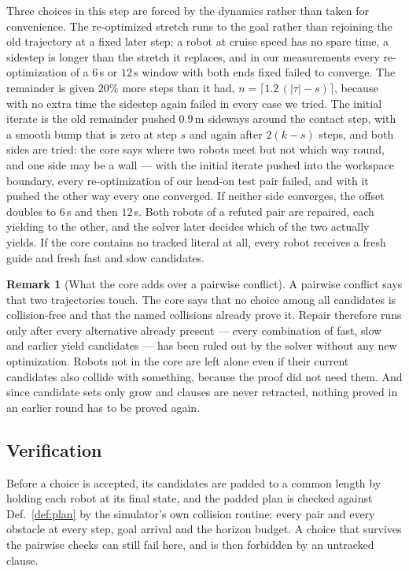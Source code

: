 \documentclass[conference]{IEEEtran}
\theoremstyle{plain}
\theoremstyle{definition}
\newtheorem{remark}{Remark}
\begin{document}
Three choices in this step are forced by the dynamics rather than taken for convenience. The
re-optimized stretch runs to the goal rather than rejoining the old trajectory at a fixed later
step: a robot at cruise speed has no spare time, a sidestep is longer than the stretch it
replaces, and in our measurements every re-optimization of a $6$\,s or $12$\,s window with both
ends fixed failed to converge. The remainder is given $20\%$ more steps than it had,
$n = \lceil 1.2\,(|\tau| - s)\rceil$, because with no extra time the sidestep again failed in
every case we tried. The initial iterate is the old remainder pushed $0.9$\,m sideways around
the contact step, with a smooth bump that is zero at step $s$ and again after $2(k-s)$ steps,
and both sides are tried: the core says where two robots meet but not which way round, and one
side may be a wall --- with the initial iterate pushed into the workspace boundary, every
re-optimization of our head-on test pair failed, and with it pushed the other way every one
converged. If neither side converges, the offset doubles to $6$\,s and
then $12$\,s. Both robots of a refuted pair are repaired, each yielding to the other, and the
solver later decides which of the two actually yields. If the core contains no tracked literal
at all, every robot receives a fresh guide and fresh fast and slow candidates.

\begin{remark}[What the core adds over a pairwise conflict]
\label{rem:corevspair}
A pairwise conflict says that two trajectories touch. The core says that no choice among all
candidates is collision-free and that the named collisions already prove it. Repair therefore
runs only after every alternative already present --- every combination of fast, slow and
earlier yield candidates --- has been ruled out by the solver without any new optimization.
Robots not in the core are left alone even if their current candidates also collide with
something, because the proof did not need them. And since candidate sets only grow and clauses
are never retracted, nothing proved in an earlier round has to be proved again.
\end{remark}

\subsection{Verification}
\label{sec:verify}

Before a choice is accepted, its candidates are padded to a common length by holding each
robot at its final state, and the padded plan is checked against Def.~\ref{def:plan} by the
simulator's own collision routine: every pair and every obstacle at every step, goal arrival
and the horizon budget. A choice that survives the pairwise checks can still fail here, and is
then forbidden by an untracked clause.
\end{document}
